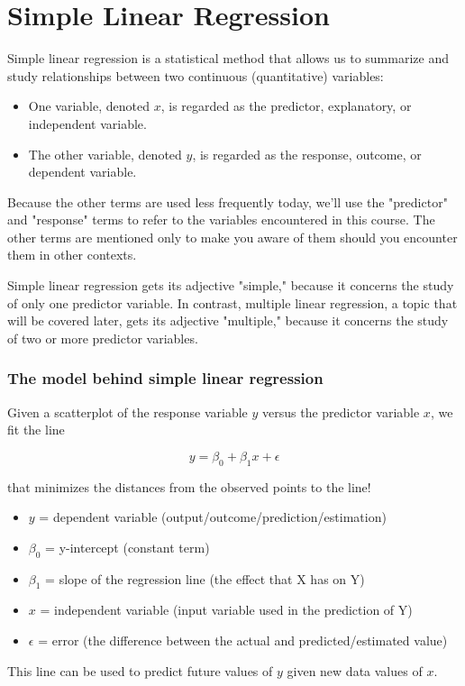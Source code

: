 \chapter{Simple Linear Regression}

Simple linear regression is a statistical method that allows us to summarize and study relationships between two continuous (quantitative) variables:

\begin{itemize}
\item One variable, denoted $x$, is regarded as the predictor, explanatory, or independent variable.
\item The other variable, denoted $y$, is regarded as the response, outcome, or dependent variable.
\end{itemize}

Because the other terms are used less frequently today, we'll use the "predictor" and "response" terms to refer to the variables encountered in this course. The other terms are mentioned only to make you aware of them should you encounter them in other contexts.

Simple linear regression gets its adjective "simple," because it concerns the study of only one predictor variable. In contrast, multiple linear regression, a topic that will be covered later, gets its adjective "multiple," because it concerns the study of two or more predictor variables.

\subsection{The model behind simple linear regression}

Given a scatterplot of the response variable $y$ versus the predictor variable $x$, we fit the line 

\begin{equation}
y = \beta_0 + \beta_1x + \epsilon
\end{equation}

that minimizes the distances from the observed points to the line!

\begin{itemize}
\item $y$ = dependent variable (output/outcome/prediction/estimation)
\item $\beta_0$ = y-intercept (constant term)
\item $\beta_1$ = slope of the regression line (the effect that X has on Y)
\item $x$ = independent variable (input variable used in the prediction of Y)
\item $\epsilon$ = error (the difference between the actual and predicted/estimated value)
\end{itemize}

This line can be used to predict future values of $y$ given new data values of $x$.
